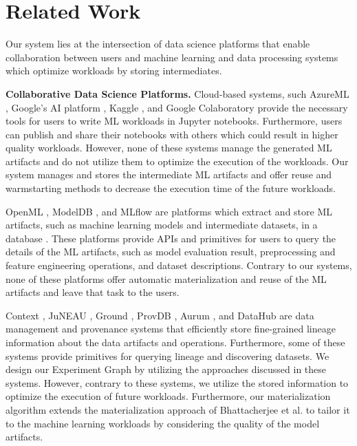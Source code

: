 \section{Related Work} \label{sec-related-work}
Our system lies at the intersection of data science platforms that enable collaboration between users and machine learning and data processing systems which optimize workloads by storing intermediates.

\textbf{Collaborative Data Science Platforms.}
Cloud-based systems, such AzureML \cite{team2016azureml}, Google's AI platform \cite{googleai}, Kaggle \cite{kagglewebsite}, and Google Colaboratory \cite{googlecolab} provide the necessary tools for users to write ML workloads in Jupyter notebooks.
Furthermore, users can publish and share their notebooks with others which could result in higher quality workloads.
However, none of these systems manage the generated ML artifacts and do not utilize them to optimize the execution of the workloads.
Our system manages and stores the intermediate ML artifacts and offer reuse and warmstarting methods to decrease the execution time of the future workloads.

OpenML \cite{vanschoren2014openml}, ModelDB \cite{vartak2016m}, and MLflow \cite{zaharia2018accelerating} are platforms which extract and store ML artifacts, such as machine learning models and intermediate datasets, in a database \cite{schelter2017automatically, Vanschoren2012}.
These platforms provide APIs and primitives for users to query the details of the ML artifacts, such as model evaluation result, preprocessing and feature engineering operations, and dataset descriptions.
Contrary to our systems, none of these platforms offer automatic materialization and reuse of the ML artifacts and leave that task to the users.

Context \cite{garcia2018context}, JuNEAU \cite{ives2019dataset}, Ground \cite{hellerstein2017ground}, ProvDB \cite{miao2018provdb}, Aurum \cite{fernandez2018aurum}, and DataHub \cite{bhardwaj2014datahub, bhattacherjee2015principles} are data management and provenance systems that efficiently store fine-grained lineage information about the data artifacts and operations.
Furthermore, some of these systems provide primitives for querying lineage and discovering datasets.
We design our Experiment Graph by utilizing the approaches discussed in these systems.
However, contrary to these systems, we utilize the stored information to optimize the execution of future workloads.
Furthermore, our materialization algorithm extends the materialization approach of Bhattacherjee et al. \cite{bhattacherjee2015principles} to tailor it to the machine learning workloads by considering the quality of the model artifacts.

